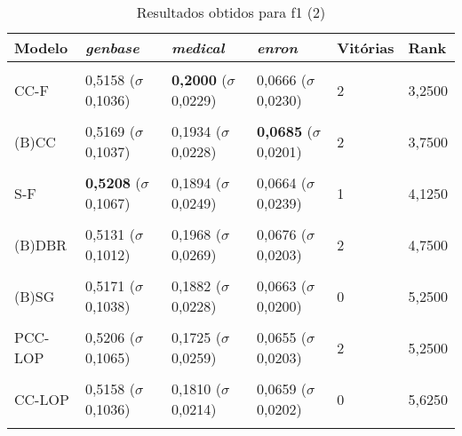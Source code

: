 \begin{table}[htbp]
	\centering
	\caption{Resultados obtidos para f1 (2)}
		\begin{tabular}
        { p{0.88in} p{0.88in} p{0.88in} p{0.88in} p{0.88in} p{0.88in} }
        
        \hline
Modelo & \textit{genbase} & \textit{medical} & \textit{enron} & \textbf{Vitórias} & \textbf{Rank} \\ 
\hline \\

CC-F & 0,5158 \newline ($\sigma$ 0,1036) & \textbf{0,2000} \newline ($\sigma$ 0,0229) & 0,0666 \newline ($\sigma$ 0,0230) & 2 & 3,2500 \\ \\
(B)CC & 0,5169 \newline ($\sigma$ 0,1037) & 0,1934 \newline ($\sigma$ 0,0228) & \textbf{0,0685} \newline ($\sigma$ 0,0201) & 2 & 3,7500 \\ \\
S-F & \textbf{0,5208} \newline ($\sigma$ 0,1067) & 0,1894 \newline ($\sigma$ 0,0249) & 0,0664 \newline ($\sigma$ 0,0239) & 1 & 4,1250 \\ \\
(B)DBR & 0,5131 \newline ($\sigma$ 0,1012) & 0,1968 \newline ($\sigma$ 0,0269) & 0,0676 \newline ($\sigma$ 0,0203) & 2 & 4,7500 \\ \\
(B)SG & 0,5171 \newline ($\sigma$ 0,1038) & 0,1882 \newline ($\sigma$ 0,0228) & 0,0663 \newline ($\sigma$ 0,0200) & 0 & 5,2500 \\ \\
PCC-LOP & 0,5206 \newline ($\sigma$ 0,1065) & 0,1725 \newline ($\sigma$ 0,0259) & 0,0655 \newline ($\sigma$ 0,0203) & 2 & 5,2500 \\ \\
CC-LOP & 0,5158 \newline ($\sigma$ 0,1036) & 0,1810 \newline ($\sigma$ 0,0214) & 0,0659 \newline ($\sigma$ 0,0202) & 0 & 5,6250 \\ \\

\end{tabular}
\end{table}
